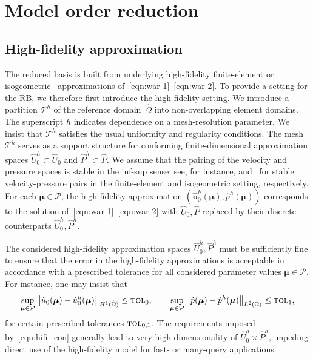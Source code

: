 \documentclass[onecolumn, twoside, a4paper, 11pt]{article}
\begin{document}
\section{Model order reduction}
\label{sec:reduction}

\subsection{High-fidelity approximation}
The reduced basis is built from underlying high-fidelity finite-element or isogeometric~\cite{Cottrell2009iat}
approximations of~\eqref{eqn:war-1}--\eqref{eqn:war-2}. To provide a setting for the RB, we therefore
first introduce the high-fidelity setting.
We introduce a partition $\mathcal{T}^h$ of the reference domain~$\hat{\Omega}$ into non-overlapping
element domains. The superscript $h$ indicates dependence
on a mesh-resolution parameter. We insist that $\mathcal{T}^h$ satisfies the usual uniformity and
regularity conditions. The mesh $\mathcal{T}^h$ serves as a support structure for conforming
finite-dimensional approximation spaces $\hat{U}_0^h\subset\hat{U}_0$ and $\hat{P}^h\subset\hat{P}$.
We assume that the pairing of the velocity and pressure spaces is stable in the inf-sup sense; see,
for instance, \cite{Taylor1973nsn,Nedelec1986nfm,Raviart1981mfe}
and~\cite{Evans2013idc1,Evans2013idc3,Buffa2011ias} for stable velocity-pressure pairs in
the finite-element and isogeometric setting,
respectively. For each $\bm{\mu}\in\mathcal{P}$, the high-fidelity approximation
$(\hat{\bm{u}}_0^h(\bm{\mu}),\hat{p}^h(\bm{\mu}))$ corresponds to the solution
of~\eqref{eqn:war-1}\nobreakdash--\eqref{eqn:war-2} with $\hat{U}_0,\hat{P}$ replaced by their
discrete counterparts $\hat{U}_0^h,\hat{P}^h$.

The considered high-fidelity approximation spaces $\hat{U}_0^h,\hat{P}^h$ must be sufficiently fine to
ensure that the error in the high-fidelity approximations is acceptable in accordance with a prescribed tolerance
for all considered parameter values $\bm{\mu}\in\mathcal{P}$. For instance, one may insist that
%
\begin{equation}
\label{eqn:hifi_con}
\sup_{\bm{\mu}\in\mathcal{P}}
\big\|\hat{u}_0(\bm{\mu})-\hat{u}_0^h(\bm{\mu})\big\|_{H^1(\hat{\Omega})}\leq\textsc{tol}_0,
\qquad
\sup_{\bm{\mu}\in\mathcal{P}}
\big\|\hat{p}(\bm{\mu})-\hat{p}^h(\bm{\mu})\big\|_{L^2(\hat{\Omega})}\leq\textsc{tol}_1,
\end{equation}
%
for certain prescribed tolerances $\textsc{tol}_{0,1}$.
The requirements imposed by~\eqref{eqn:hifi_con} generally lead to very high dimensionality of $\hat{U}_0^h\times\hat{P}^h$,
impeding direct use of the high-fidelity model for fast- or many-query applications.
\end{document}
